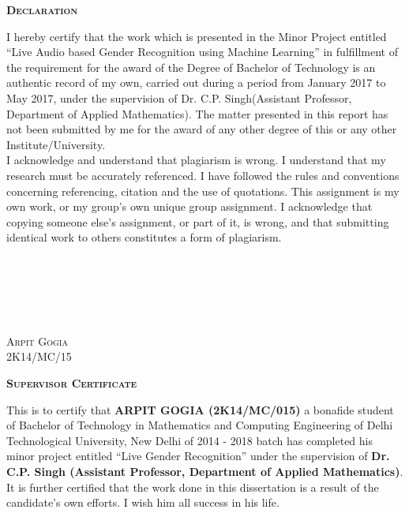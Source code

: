 \documentclass[12pt]{article}
\begin{document}
	\begin{center}
		\textsc{\large \textbf{Declaration}}\\[1.5cm]
	\end{center}
	\textnormal{I hereby certify that the work which is presented in the Minor Project entitled “Live Audio based Gender Recognition using Machine Learning” in fulfillment of the requirement for the award of the Degree of Bachelor of Technology is an authentic record of my own, carried out during a period from January 2017 to May 2017, under the supervision of Dr. C.P. Singh(Assistant Professor, Department of Applied Mathematics). The matter presented in this report has not been submitted by me for the award of any other degree of this or any other Institute/University.}
	\textnormal{\\I acknowledge and understand that plagiarism is wrong. I understand that my research must be accurately referenced. I have followed the rules and conventions concerning referencing, citation and the use of quotations. This assignment is my own work, or my group’s own unique group  assignment. I acknowledge that copying someone else’s assignment, or part of it, is wrong, and that submitting identical work to others constitutes a form of plagiarism. }	
	\textnormal{\\}
	\textnormal{\\}
	\textnormal{\\}
	\textnormal{\\}
	\textnormal{\\}
	\textnormal{\\}
	\begin{flushright}
		\textsc{Arpit Gogia\\}
		\textsc{2K14/MC/15}
	\end{flushright}
	\pagebreak
	\begin{center}
		\textsc{\large \textbf{Supervisor Certificate}}\\[1.5cm]
	\end{center}
	\textnormal{This is to certify that \textbf{ARPIT GOGIA (2K14/MC/015)} a bonafide student of Bachelor of Technology in Mathematics and Computing Engineering of Delhi Technological University, New Delhi of 2014 - 2018 batch has completed his minor project entitled “Live Gender Recognition” under the supervision of \textbf{Dr. C.P. Singh (Assistant Professor, Department of Applied Mathematics)}.}
	\textnormal{It is further certified that the work done in this dissertation is a result of the candidate's own efforts.}
	\textnormal{I wish him all success in his life.\\~\\}
\end{document}

